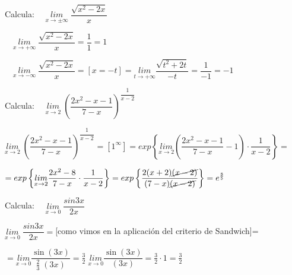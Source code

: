 	
	\begin{ejre}Calcula: $\quad \underset{x \to \pm \infty}{lim}\; {\dfrac {\sqrt{x^2-2x}}{x}}$
		
	\end{ejre}
	
	\begin{proofw}\renewcommand{\qedsymbol}{$\diamond$}

	 $\quad \underset{x \to +\infty}{lim}\; {\dfrac {\sqrt{x^2-2x}}{x}}=\dfrac 1 1 = 1$
	 
	  $\quad \underset{x \to  -\infty}{lim}\; {\dfrac {\sqrt{x^2-2x}}{x}}=[x=-t]=\underset {t\to +\infty}{lim}{\dfrac {\sqrt{t^2+2t}}{-t}}= \dfrac 1 {-1}=-1$
	\end{proofw}
	
	\begin{ejre}Calcula: $\quad \underset{x\to 2}{lim}\; {\left(\dfrac {2x^2-x-1}{7-x}\right)^{\dfrac {1}{x-2}}}$
		
	\end{ejre}
	
	\begin{proofw}\renewcommand{\qedsymbol}{$\diamond$}

	$\underset{x\to 2}{lim}\; {\left(\dfrac {2x^2-x-1}{7-x}\right)^{\dfrac {1}{x-2}}}=[1^\infty]=exp \left\{ 
		\underset {x\to 2}{lim}
		{\left (\dfrac {2x^2-x-1}{7-x} -1 \right)\cdot \dfrac {1}{x-2}}
		\right\}=$
		
		$= exp \left\{\underset {x\to 2}{lim}
		{\dfrac {2x^2-8}{7-x} \cdot \dfrac {1}{x-2}}
		\right\}=
		exp 
		\left\{ 
		\dfrac {2(x+2)\cancel{(x-2)}} {(7-x)\cancel{(x-2)}}  
		\right\} 
		=e^{\frac 8 5}$
	\end{proofw}
	
	
	\begin{ejre}Calcula: $\quad \underset{x\to 0}{lim}\;{\dfrac {sin 3x}{2x}}$
		
	\end{ejre}
	
	\begin{proofw}\renewcommand{\qedsymbol}{$\diamond$}
	
	$\underset{x\to 0}{lim}\;{\dfrac {sin 3x}{2x}}=$[como vimos en la aplicación del criterio de Sandwich]=
	
	$=\underset {x\to 0}{lim}{ \dfrac {\sin (3x)} {\frac 2 3 \; (3x)}  }= \frac 3 2 \; \underset {x\to 0}{lim}{\dfrac {\sin (3x)}{(3x)}}= \frac 3 2 \cdot 1 = \frac 3 2$
	
	\end{proofw}
	
